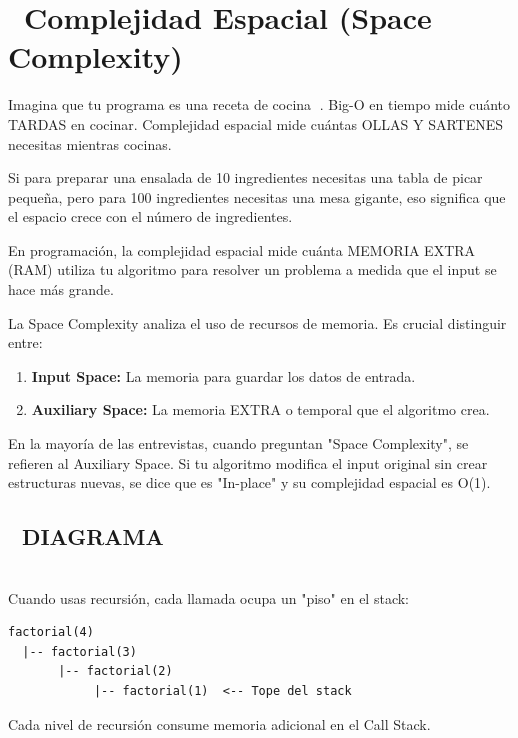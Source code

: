 ﻿\chapter[\emj{💾}~Complejidad Espacial (Space Complexity)]{~Complejidad Espacial (Space Complexity)}

\begin{dsaquees}

Imagina que tu programa es una receta de cocina 🍳. Big-O en tiempo
mide cuánto TARDAS en cocinar. Complejidad espacial mide cuántas
OLLAS Y SARTENES necesitas mientras cocinas.

Si para preparar una ensalada de 10 ingredientes necesitas una tabla
de picar pequeña, pero para 100 ingredientes necesitas una mesa gigante,
eso significa que el espacio crece con el número de ingredientes.

En programación, la complejidad espacial mide cuánta MEMORIA EXTRA
(RAM) utiliza tu algoritmo para resolver un problema a medida que el
input se hace más grande.

\end{dsaquees}

\begin{dsaotraforma}

La Space Complexity analiza el uso de recursos de memoria. Es crucial
distinguir entre:

\begin{enumerate}
    \item \textbf{Input Space:} La memoria para guardar los datos de entrada.
    \item \textbf{Auxiliary Space:} La memoria EXTRA o temporal que el algoritmo crea.
\end{enumerate}

En la mayoría de las entrevistas, cuando preguntan "Space Complexity",
se refieren al Auxiliary Space. Si tu algoritmo modifica el input original
sin crear estructuras nuevas, se dice que es "In-place" y su complejidad
espacial es O(1).

\end{dsaotraforma}

\section*{🎨 DIAGRAMA}
\hrulefill \\
Cuando usas recursión, cada llamada ocupa un "piso" en el stack:

\begin{verbatim}
factorial(4)
  |-- factorial(3)
       |-- factorial(2)
            |-- factorial(1)  <-- Tope del stack
\end{verbatim}
Cada nivel de recursión consume memoria adicional en el Call Stack.

